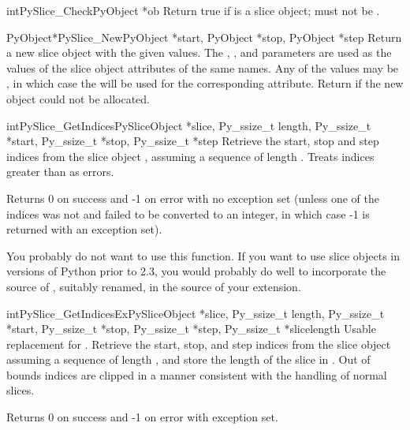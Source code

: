 \begin{cfuncdesc}{int}{PySlice_Check}{PyObject *ob}
  Return true if  is a slice object;  must not be
  \NULL{}.
\end{cfuncdesc}

\begin{cfuncdesc}{PyObject*}{PySlice_New}{PyObject *start, PyObject *stop,
                                          PyObject *step}
  Return a new slice object with the given values.  The ,
  , and  parameters are used as the values of the
  slice object attributes of the same names.  Any of the values may be
  \NULL{}, in which case the  will be used for the
  corresponding attribute.  Return \NULL{} if the new object could
  not be allocated.
\end{cfuncdesc}

\begin{cfuncdesc}{int}{PySlice_GetIndices}{PySliceObject *slice, Py_ssize_t length,
                                           Py_ssize_t *start, Py_ssize_t *stop, Py_ssize_t *step}
Retrieve the start, stop and step indices from the slice object
, assuming a sequence of length . Treats
indices greater than  as errors.

Returns 0 on success and -1 on error with no exception set (unless one
of the indices was not  and failed to be converted to
an integer, in which case -1 is returned with an exception set).

You probably do not want to use this function.  If you want to use
slice objects in versions of Python prior to 2.3, you would probably
do well to incorporate the source of ,
suitably renamed, in the source of your extension.
\end{cfuncdesc}

\begin{cfuncdesc}{int}{PySlice_GetIndicesEx}{PySliceObject *slice, Py_ssize_t length,
                                             Py_ssize_t *start, Py_ssize_t *stop, Py_ssize_t *step,
                                             Py_ssize_t *slicelength}
Usable replacement for .  Retrieve the
start, stop, and step indices from the slice object 
assuming a sequence of length , and store the length of
the slice in .  Out of bounds indices are clipped in
a manner consistent with the handling of normal slices.

Returns 0 on success and -1 on error with exception set.

\end{cfuncdesc}


